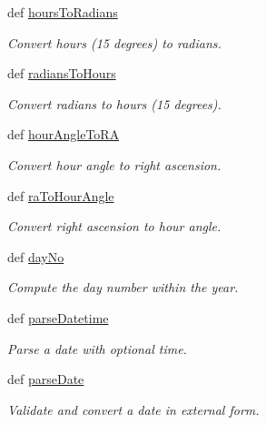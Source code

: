 \begin{DoxyCompactItemize}
\item 
def \hyperlink{namespaceamonpy_1_1sim_1_1sidereal__m_a1affdf4da55cb24ade645cf265f593a4}{hours\-To\-Radians}
\begin{DoxyCompactList}\small\item\em Convert hours (15 degrees) to radians. \end{DoxyCompactList}\item 
def \hyperlink{namespaceamonpy_1_1sim_1_1sidereal__m_a513707c41b62ea74533a1a4544c17ef5}{radians\-To\-Hours}
\begin{DoxyCompactList}\small\item\em Convert radians to hours (15 degrees). \end{DoxyCompactList}\item 
def \hyperlink{namespaceamonpy_1_1sim_1_1sidereal__m_a46261e368cf956117757a1ffaab3899a}{hour\-Angle\-To\-R\-A}
\begin{DoxyCompactList}\small\item\em Convert hour angle to right ascension. \end{DoxyCompactList}\item 
def \hyperlink{namespaceamonpy_1_1sim_1_1sidereal__m_af251819f3481dec2fc2af59cbfcef83d}{ra\-To\-Hour\-Angle}
\begin{DoxyCompactList}\small\item\em Convert right ascension to hour angle. \end{DoxyCompactList}\item 
def \hyperlink{namespaceamonpy_1_1sim_1_1sidereal__m_a1fbf551c6b08a7fe2d732c0ab45cd138}{day\-No}
\begin{DoxyCompactList}\small\item\em Compute the day number within the year. \end{DoxyCompactList}\item 
def \hyperlink{namespaceamonpy_1_1sim_1_1sidereal__m_a88878c50f4b1ef900a025767cd910261}{parse\-Datetime}
\begin{DoxyCompactList}\small\item\em Parse a date with optional time. \end{DoxyCompactList}\item 
def \hyperlink{namespaceamonpy_1_1sim_1_1sidereal__m_a04160e8d887e66c39a2a7e634a8a3348}{parse\-Date}
\begin{DoxyCompactList}\small\item\em Validate and convert a date in external form. \end{DoxyCompactList}\item 

\end{DoxyCompactItemize}
